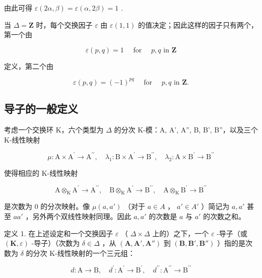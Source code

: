 由此可得 \(\varepsilon(2\alpha, \beta) = \varepsilon(\alpha, 2\beta) = 1\) .

当 \(\Delta = \mathbf{Z}\) 时，每个交换因子 \(\varepsilon\) 由 \(\varepsilon(1, 1)\) 的值决定；因此这样的因子只有两个，第一个由

\[
\varepsilon (p, q) = 1 \quad \text { for } \quad p, q \text { in } \mathbf {Z}\tag{2}
\]

定义，第二个由

\[
\varepsilon (p, q) = (- 1) ^ {p q} \quad \text { for } \quad p, q \text { in } \mathbf {Z}.\tag{3}
\]

\subsection{导子的一般定义}

考虑一个交换环 K，六个类型为 \(\Delta\) 的分次 K-模：A, A', A'', B, B', B''，以及三个 K-线性映射

\[
\mu \colon \mathrm{A} \times \mathrm{A} ^ {\prime} \rightarrow \mathrm{A} ^ {\prime \prime}, \quad \lambda_ {1} \colon \mathrm{B} \times \mathrm{A} ^ {\prime} \rightarrow \mathrm{B} ^ {\prime \prime}, \quad \lambda_ {2} \colon \mathrm{A} \times \mathrm{B} ^ {\prime} \rightarrow \mathrm{B} ^ {\prime \prime}
\]

使得相应的 K-线性映射

\[
\mathrm{A} \otimes_ {\mathrm{K}} \mathrm{A} ^ {\prime} \rightarrow \mathrm{A} ^ {\prime \prime}, \quad \mathrm{B} \otimes_ {\mathrm{K}} \mathrm{A} ^ {\prime} \rightarrow \mathrm{B} ^ {\prime \prime}, \quad \mathrm{A} \otimes_ {\mathrm{K}} \mathrm{B} ^ {\prime} \rightarrow \mathrm{B} ^ {\prime \prime}
\]

是次数为 0 的分次映射。像 \(\mu(a, a')\) （对于 \(a \in A\) ， \(a' \in A'\) ）简记为 \(a, a'\) 甚至 \(aa'\) ，另外两个双线性映射同理。因此 \(a, a'\) 的次数是 \(a\) 与 \(a'\) 的次数之和。

定义 1. 在上述设定和一个交换因子 \(\varepsilon\) （ \(\Delta \times \Delta\) 上的）之下，一个 \(\varepsilon\) -导子（或 \((\mathbf{K}, \varepsilon)\) -导子）（次数为 \(\delta \in \Delta\) ，从 \((\mathbf{A}, \mathbf{A}', \mathbf{A}'')\) 到 \((\mathbf{B}, \mathbf{B}', \mathbf{B}'')\) ）指的是次数为 \(\delta\) 的分次 K-线性映射的一个三元组：

\[
d \colon \mathrm{A} \rightarrow \mathrm{B}, \quad d ^ {\prime} \colon \mathrm{A} ^ {\prime} \rightarrow \mathrm{B} ^ {\prime}, \quad d ^ {\prime \prime} \colon \mathrm{A} ^ {\prime \prime} \rightarrow \mathrm{B} ^ {\prime \prime}
\]

